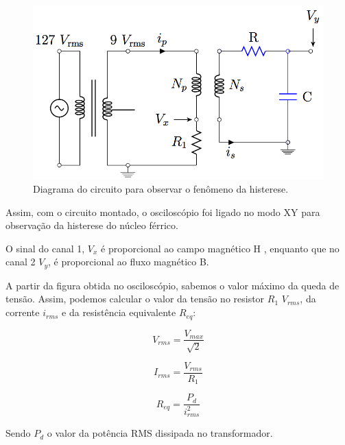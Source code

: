 \documentclass[11pt,a4paper]{article}
\begin{document}
    \begin{figure}[!htb]
    \centering
    \includegraphics[scale=0.25]{Circ2.pdf}
    \caption{Diagrama do circuito para observar o fenômeno da histerese.}
    \label{Circ2}
    \end{figure}

	Assim, com o circuito montado, o osciloscópio foi ligado no modo XY para observação da histerese do núcleo férrico.
	
	O sinal do canal 1, $V_x$ é proporcional ao campo magnético H , enquanto que no canal 2 $V_y$, é proporcional ao fluxo magnético B.

    A partir da figura obtida no osciloscópio, sabemos o valor máximo da queda de tensão. Assim, podemos calcular o valor da tensão no resistor $R_1$ $V_{rms}$, da corrente $i_{rms}$ e da resistência equivalente $R_{eq}$:
    
    \begin{equation}
	    V_{rms} = \dfrac{V_{max}}{\sqrt{2}}
	    \label{Vrms}
	\end{equation}
	
	\begin{equation}
	    I_{rms} = \dfrac{V_{rms}}{R_1}
	    \label{Irms}
	\end{equation}
	
	\begin{equation}
	    R_{eq} = \dfrac{P_d}{i_{rms}^2}
	    \label{Req}
	\end{equation}
	
	Sendo $P_d$ o valor da potência RMS dissipada no transformador.
\end{document}
